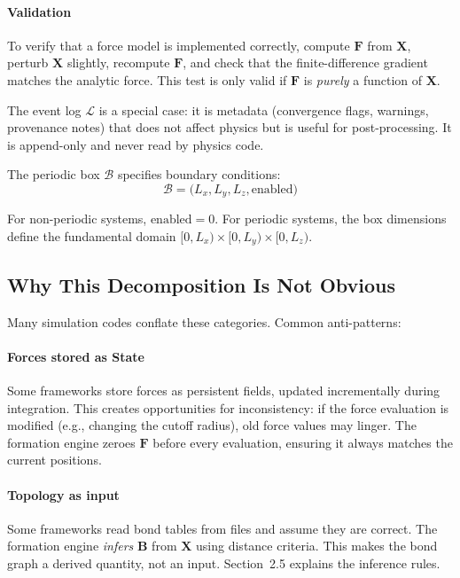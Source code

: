 \documentclass[11pt]{article}
\begin{document}
\paragraph{Validation} To verify that a force model is implemented correctly, compute $\mathbf{F}$ from $\mathbf{X}$, perturb $\mathbf{X}$ slightly, recompute $\mathbf{F}$, and check that the finite-difference gradient matches the analytic force. This test is only valid if $\mathbf{F}$ is \textit{purely} a function of $\mathbf{X}$.

The event log $\mathcal{L}$ is a special case: it is metadata (convergence flags, warnings, provenance notes) that does not affect physics but is useful for post-processing. It is append-only and never read by physics code.

The periodic box $\mathcal{B}$ specifies boundary conditions:
\begin{equation}
\mathcal{B} = \bigl(L_x, L_y, L_z, \text{enabled}\bigr)
\end{equation}

For non-periodic systems, $\text{enabled} = 0$. For periodic systems, the box dimensions define the fundamental domain $[0, L_x) \times [0, L_y) \times [0, L_z)$.

\subsection{Why This Decomposition Is Not Obvious}

Many simulation codes conflate these categories. Common anti-patterns:

\paragraph{Forces stored as State} Some frameworks store forces as persistent fields, updated incrementally during integration. This creates opportunities for inconsistency: if the force evaluation is modified (e.g., changing the cutoff radius), old force values may linger. The formation engine zeroes $\mathbf{F}$ before every evaluation, ensuring it always matches the current positions.

\paragraph{Topology as input} Some frameworks read bond tables from files and assume they are correct. The formation engine \textit{infers} $\mathbf{B}$ from $\mathbf{X}$ using distance criteria. This makes the bond graph a derived quantity, not an input. Section~2.5 explains the inference rules.
\end{document}
